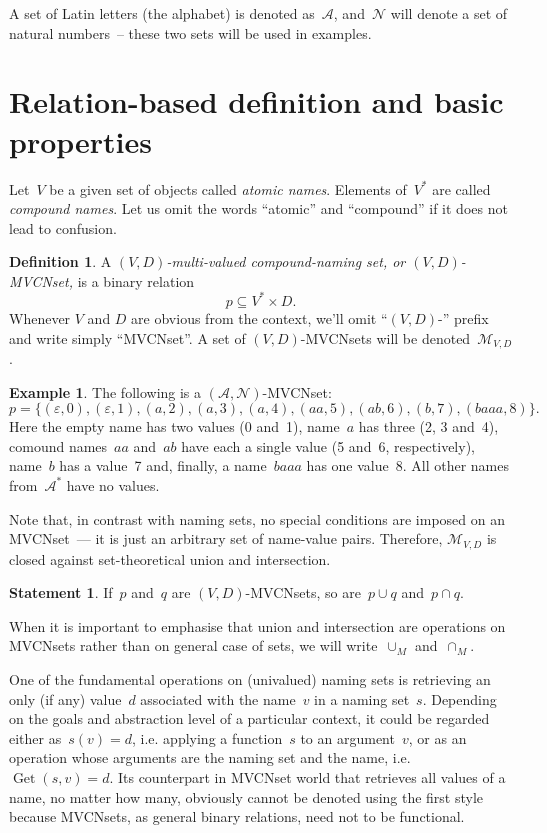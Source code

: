 \documentclass{article}
\theoremstyle{definition}
\newtheorem{Df}{Definition}
\newtheorem{St}{Statement}
\newtheorem{Ex}{Example}
\newcommand{\setcharmvcn}{M}
\newcommand{\setsymbol}[3]{\mathcal{#1}_{#2,#3}}
\newcommand{\setmvcn}[2]{\setsymbol{\setcharmvcn}{#1}{#2}}
\newcommand{\seta}{\mathcal{A}}
\newcommand{\setn}{\mathcal{N}}
\newcommand{\deref}{\operatorname{Get}}
\begin{document}
A set of Latin letters (the alphabet) is denoted as~$\seta$,
and~$\setn$ will denote a set of natural numbers~-- these two sets will be
used in examples.



\section{Relation-based definition and basic properties}

Let~$V$ be a given set of objects called \emph{atomic names}. Elements
of~$V^\ast$ are called \emph{compound names}. Let us omit the words ``atomic''
and ``compound'' if it does not lead to confusion.

\begin{Df}\label{df:mvcn}
A \emph{$(V,D)$-multi-valued compound-naming set, or $(V,D)$-MVCNset,} is a binary
relation
\[
  p \subseteq V^\ast \times D .
\]
Whenever $V$ and $D$ are obvious from the context, we'll omit ``$(V,D)$-''
prefix and write simply ``MVCNset''. A set of $(V,D)$-MVCNsets will be
denoted~$\setmvcn{V}{D}$.
\end{Df}

\begin{Ex}\label{ex:mvcn}
The following is a $(\seta, \setn)$-MVCNset:
\[
  p = \{
    (\varepsilon, 0),
    (\varepsilon, 1),
    (a,           2),
    (a,           3),
    (a,           4),
    (aa,          5),
    (ab,          6),
    (b,           7),
    (baaa,        8)
  \} .
\]
Here the empty name has two values (0 and~1), name~$a$ has three (2, 3 and~4),
comound names~$aa$ and~$ab$ have each a single value (5 and~6, respectively),
name~$b$ has a value~7 and, finally, a name~$baaa$ has one value~8. All other
names from~$\seta^\ast$ have no values.
\end{Ex}

Note that, in contrast with naming sets, no special conditions are imposed
on an MVCNset~--- it is just an arbitrary set of name-value pairs.
Therefore, $\setmvcn{V}{D}$ is closed against set-theoretical union
and intersection.
\begin{St}\label{st:mvcn-setop}
If~$p$ and~$q$ are $(V,D)$-MVCNsets, so are~$p\cup q$ and~$p\cap q$.
\end{St}

When it is important to emphasise that union and intersection are operations
on MVCNsets rather than on general case of sets, we will
write~$\cup_\setcharmvcn$ and~$\cap_\setcharmvcn$.

One of the fundamental operations on (univalued) naming sets is retrieving
an only (if any) value~$d$ associated with the name~$v$ in a naming
set~$s$.  Depending on the goals and abstraction level of a particular
context, it could be regarded either as~$s(v)=d$, i.e. applying a function~$s$
to an argument~$v$, or as an operation whose arguments are the naming set and
the name, i.e.~$\deref(s, v)=d$. Its counterpart in MVCNset world that
retrieves all values of a name, no matter how many, obviously cannot be denoted
using the first style because MVCNsets, as general binary relations, need not
to be functional.
\end{document}
